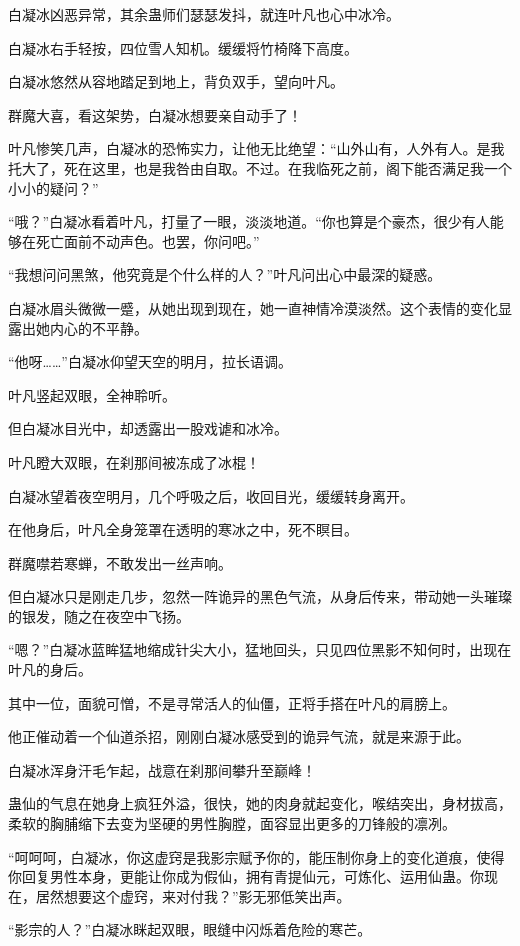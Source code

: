 \begin{this_body}
白凝冰凶恶异常，其余蛊师们瑟瑟发抖，就连叶凡也心中冰冷。

白凝冰右手轻按，四位雪人知机。缓缓将竹椅降下高度。

白凝冰悠然从容地踏足到地上，背负双手，望向叶凡。

群魔大喜，看这架势，白凝冰想要亲自动手了！

叶凡惨笑几声，白凝冰的恐怖实力，让他无比绝望：“山外山有，人外有人。是我托大了，死在这里，也是我咎由自取。不过。在我临死之前，阁下能否满足我一个小小的疑问？”

“哦？”白凝冰看着叶凡，打量了一眼，淡淡地道。“你也算是个豪杰，很少有人能够在死亡面前不动声色。也罢，你问吧。”

“我想问问黑煞，他究竟是个什么样的人？”叶凡问出心中最深的疑惑。

白凝冰眉头微微一蹙，从她出现到现在，她一直神情冷漠淡然。这个表情的变化显露出她内心的不平静。

“他呀……”白凝冰仰望天空的明月，拉长语调。

叶凡竖起双眼，全神聆听。

但白凝冰目光中，却透露出一股戏谑和冰冷。

叶凡瞪大双眼，在刹那间被冻成了冰棍！

白凝冰望着夜空明月，几个呼吸之后，收回目光，缓缓转身离开。

在他身后，叶凡全身笼罩在透明的寒冰之中，死不瞑目。

群魔噤若寒蝉，不敢发出一丝声响。

但白凝冰只是刚走几步，忽然一阵诡异的黑色气流，从身后传来，带动她一头璀璨的银发，随之在夜空中飞扬。

“嗯？”白凝冰蓝眸猛地缩成针尖大小，猛地回头，只见四位黑影不知何时，出现在叶凡的身后。

其中一位，面貌可憎，不是寻常活人的仙僵，正将手搭在叶凡的肩膀上。

他正催动着一个仙道杀招，刚刚白凝冰感受到的诡异气流，就是来源于此。

白凝冰浑身汗毛乍起，战意在刹那间攀升至巅峰！

蛊仙的气息在她身上疯狂外溢，很快，她的肉身就起变化，喉结突出，身材拔高，柔软的胸脯缩下去变为坚硬的男性胸膛，面容显出更多的刀锋般的凛冽。

“呵呵呵，白凝冰，你这虚窍是我影宗赋予你的，能压制你身上的变化道痕，使得你回复男性本身，更能让你成为假仙，拥有青提仙元，可炼化、运用仙蛊。你现在，居然想要这个虚窍，来对付我？”影无邪低笑出声。

“影宗的人？”白凝冰眯起双眼，眼缝中闪烁着危险的寒芒。


\end{this_body}

